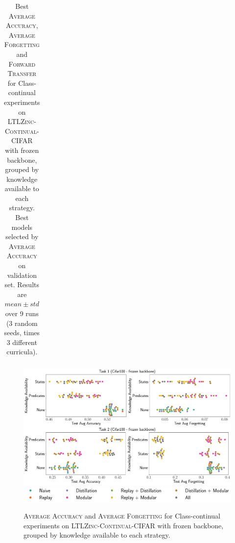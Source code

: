 \begin{table}
{\begin{tabular}{ccccccccccc}
			\bottomrule
		\end{tabular}
	}
	\caption[Results on \textsc{LTLZinc-Continual-CIFAR} (frozen backbone)]{Best \textsc{Average Accuracy}, \textsc{Average Forgetting} and \textsc{Forward Transfer} for Class-continual experiments on \textsc{LTLZinc-Continual-CIFAR} with frozen backbone, grouped by knowledge available to each strategy. Best models selected by \textsc{Average Accuracy} on validation set. Results are $mean \pm std$ over 9 runs (3 random seeds, times 3 different curricula).}
	\label{ltlzinc:tab:incremental-results-cifar-frozen}
\end{table}

\begin{figure}
	\centering
	\begin{minipage}{\linewidth}
		\includegraphics[width=\textwidth]{imgs/ltlzinc/swarm_cifar_frozen.pdf}\\
		\includegraphics[width=\textwidth]{imgs/ltlzinc/swarm_legend.pdf}
	\end{minipage}
	\caption[\textsc{Average Accuracy} and \textsc{Average Forgetting} on \textsc{LTLZinc-Continual-CIFAR} (frozen backbone)]{\textsc{Average Accuracy} and \textsc{Average Forgetting} for Class-continual experiments on \textsc{LTLZinc-Continual-CIFAR} with frozen backbone, grouped by knowledge available to each strategy.}
	\label{ltlzinc:fig:swarm-cifar-frozen}
\end{figure}
